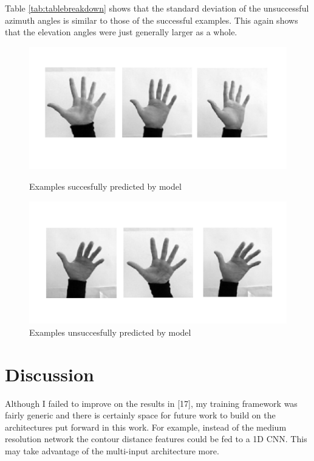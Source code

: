 \documentclass{article}
\begin{document}
Table \ref{tab:tablebreakdown} shows that the standard deviation of the unsuccessful azimuth angles is similar to those of the successful examples. This again shows that the elevation angles were just generally larger as a whole.




\begin{figure}[h]
 \hspace*{0cm}
  \includegraphics[scale=0.6]{goodz.pdf}
   \vspace*{-21mm}
  \caption{Examples succesfully predicted by model}
  \label{fig:goodz}

\hspace*{0cm}
  \includegraphics[scale=0.6]{badz.pdf}
  \vspace*{-18mm}
  \caption{Examples unsuccesfully predicted by model}
  \label{fig:badz}

\end{figure}




\section{Discussion}



Although I failed to improve on the results in [17], my training framework was fairly generic and there is certainly space for future work to build on the architectures put forward in this work. For example, instead of the medium resolution network the contour distance features could be fed to a 1D CNN. This may take advantage of the multi-input architecture more. \\
\end{document}
